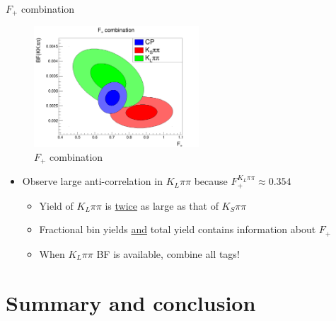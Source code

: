 \documentclass{beamer}
\begin{document}
\begin{frame}{$F_+$ combination}
  \begin{figure}
    \includegraphics[width = 0.55\textwidth]{Plots/FPlus_contours.png}
    \caption{$F_+$ combination}
  \end{figure}
  \vspace{-0.6cm}
  \begin{itemize}
    \item{Observe large anti-correlation in $K_L\pi\pi$ because $F^{K_L\pi\pi}_+\approx 0.354$}
    \begin{itemize}
      \item{Yield of $K_L\pi\pi$ is \underline{twice} as large as that of $K_S\pi\pi$}
      \item{Fractional bin yields \underline{and} total yield contains information about $F_+$}
      \item{When $K_L\pi\pi$ BF is available, combine all tags!}
    \end{itemize}
  \end{itemize}
\end{frame}

\section{Summary and conclusion}
\end{document}
